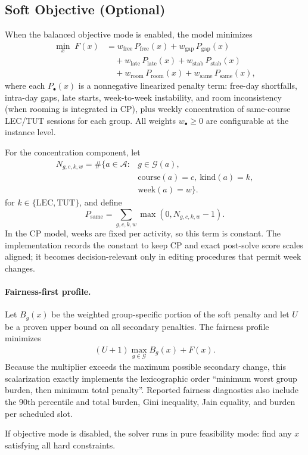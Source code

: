 \subsection{Soft Objective (Optional)}
When the balanced objective mode is enabled, the model minimizes
\begin{align}
\min_{x}\; F(x)
&=
w_{\mathrm{free}}\,P_{\mathrm{free}}(x)
+w_{\mathrm{gap}}\,P_{\mathrm{gap}}(x)\nonumber\\
&\quad
+w_{\mathrm{late}}\,P_{\mathrm{late}}(x)
+w_{\mathrm{stab}}\,P_{\mathrm{stab}}(x)\nonumber\\
&\quad
+w_{\mathrm{room}}\,P_{\mathrm{room}}(x)
+w_{\mathrm{same}}\,P_{\mathrm{same}}(x),
\label{eq:softobj}
\end{align}
where each \(P_{\bullet}(x)\) is a nonnegative linearized penalty term:
free-day shortfalls, intra-day gaps, late starts, week-to-week instability, and
room inconsistency (when rooming is integrated in CP), plus weekly concentration
of same-course LEC/TUT sessions for each group.
All weights \(w_{\bullet}\ge 0\) are configurable at the instance level.

For the concentration component, let
\begin{align*}
N_{g,c,k,w}=\#\{a\in\mathcal{A}:{}&g\in\mathcal{G}(a),\\
&\mathrm{course}(a)=c,\ \mathrm{kind}(a)=k,\\
&\mathrm{week}(a)=w\}.
\end{align*}
for \(k\in\{\mathrm{LEC},\mathrm{TUT}\}\), and define
\[
P_{\mathrm{same}}=\sum_{g,c,k,w}\max(0,N_{g,c,k,w}-1).
\]
In the CP model, weeks are fixed per activity, so this term is constant.
The implementation records the constant to keep CP and exact post-solve score scales aligned; it becomes decision-relevant only in editing procedures that permit week changes.

\paragraph{Fairness-first profile.}
Let $B_g(x)$ be the weighted group-specific portion of the soft penalty and let $U$ be a proven upper bound on all secondary penalties.
The fairness profile minimizes
\begin{align}
(U+1)\max_{g\in\mathcal{G}}B_g(x)+F(x).
\end{align}
Because the multiplier exceeds the maximum possible secondary change, this scalarization exactly implements the lexicographic order ``minimum worst group burden, then minimum total penalty''.
Reported fairness diagnostics also include the 90th percentile and total burden, Gini inequality, Jain equality, and burden per scheduled slot.

If objective mode is disabled, the solver runs in pure feasibility mode:
find any \(x\) satisfying all hard constraints.
